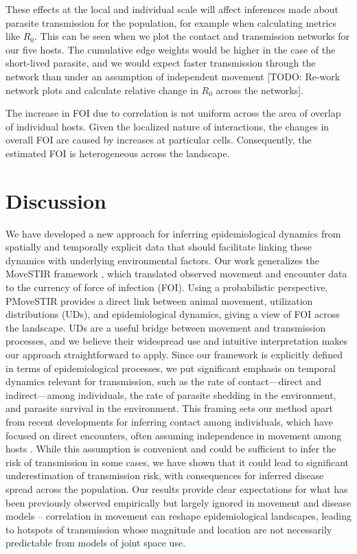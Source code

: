 \documentclass[letterpaper]{article}
\begin{document}
These effects at the local and individual scale will affect inferences made about parasite transmission for the population, for example when calculating metrics like $R_0$. This can be seen when we plot the contact and transmission networks for our five hosts. The cumulative edge weights would be higher in the case of the short-lived parasite, and we would expect faster transmission through the network than under an assumption of independent movement [TODO: Re-work network plots and calculate relative change in $R_0$ across the networks]. 

The increase in FOI due to correlation is not uniform across the area of overlap of individual hosts. Given the localized nature of interactions, the changes in overall FOI are caused by increases at particular cells. Consequently, the estimated FOI is heterogeneous across the landscape. 

\section*{Discussion}

We have developed a new approach for inferring epidemiological dynamics from spatially and temporally explicit data that should facilitate linking these dynamics with underlying environmental factors. Our work generalizes the MoveSTIR framework \citep{Wilber2022}, which translated observed movement and encounter data to the currency of force of infection (FOI). Using a probabilistic perspective, PMoveSTIR provides a direct link between animal movement, utilization distributions (UDs), and epidemiological dynamics, giving a view of FOI across the landscape. UDs are a useful bridge between movement and transmission processes, and we believe their widespread use and intuitive interpretation makes our approach straightforward to apply.
Since our framework is explicitly defined in terms of epidemiological processes, we put significant emphasis on temporal dynamics relevant for transmission, such as the rate of contact---direct and indirect---among individuals, the rate of parasite shedding in the environment, and parasite survival in the environment. 
This framing sets our method apart from recent developments for inferring contact among individuals, which have focused on direct encounters, often assuming independence in movement among hosts \citep{Noonan2021,Das2023}. While this assumption is convenient and could be sufficient to infer the risk of transmission in some cases, we have shown that it could lead to significant underestimation of transmission risk, with consequences for inferred disease spread across the population. Our results provide clear expectations for what has been previously observed empirically but largely ignored in movement and disease models -- correlation in movement can reshape epidemiological landscapes, leading to hotspots of transmission whose magnitude and location are not necessarily predictable from models of joint space use.
\end{document}
